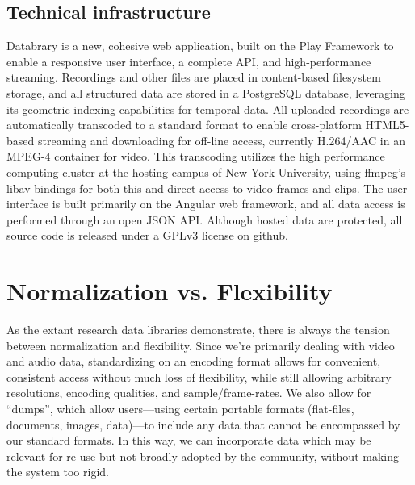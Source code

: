 \documentclass{sig-alternate}
\begin{document}
\subsection{Technical infrastructure}


Databrary is a new, cohesive web application, built on the Play Framework to enable a responsive user interface, a complete API, and high-performance streaming.
Recordings and other files are placed in content-based filesystem storage, and all structured data are stored in a PostgreSQL database, leveraging its geometric indexing capabilities for temporal data.
All uploaded recordings are automatically transcoded to a standard format to enable cross-platform HTML5-based streaming and downloading for off-line access, currently H.264/AAC in an MPEG-4 container for video.
This transcoding utilizes the high performance computing cluster at the hosting campus of New York University, using ffmpeg's libav bindings for both this and direct access to video frames and clips.
The user interface is built primarily on the Angular web framework, and all data access is performed through an open JSON API.
Although hosted data are protected, all source code is released under a GPLv3 license on github.

\section{Normalization vs. Flexibility}

As the extant research data libraries demonstrate, there is always the tension between normalization and flexibility.
Since we're primarily dealing with video and audio data, standardizing on an encoding format allows for convenient, consistent access without much loss of flexibility, while still allowing arbitrary resolutions, encoding qualities, and sample/frame-rates.
We also allow for ``dumps'', which allow users---using certain portable formats (flat-files, documents, images, data)---to include any data that cannot be encompassed by our standard formats.
In this way, we can incorporate data which may be relevant for re-use but not broadly adopted by the community, without making the system too rigid.
\end{document}
